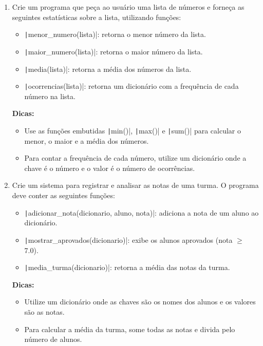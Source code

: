 \documentclass[12pt]{article}
\begin{document}
\begin{enumerate}
  \item Crie um programa que peça ao usuário uma lista de números e forneça as seguintes estatísticas sobre a lista, utilizando funções:
    \begin{itemize}
      \item \texttt|menor_numero(lista)|: retorna o menor número da lista.
      \item \texttt|maior_numero(lista)|: retorna o maior número da lista.
      \item \texttt|media(lista)|: retorna a média dos números da lista.
      \item \texttt|ocorrencias(lista)|: retorna um dicionário com a frequência de cada número na lista.
    \end{itemize}
    \textbf{Dicas:}
    \begin{itemize}
      \item Use as funções embutidas \texttt|min()|, \texttt|max()| e \texttt|sum()| para calcular o menor, o maior e a média dos números.
      \item Para contar a frequência de cada número, utilize um dicionário onde a chave é o número e o valor é o número de ocorrências.
    \end{itemize}
  \item Crie um sistema para registrar e analisar as notas de uma turma. O programa deve conter as seguintes funções:
    \begin{itemize}
      \item \texttt|adicionar_nota(dicionario, aluno, nota)|: adiciona a nota de um aluno ao dicionário.
      \item \texttt|mostrar_aprovados(dicionario)|: exibe os alunos aprovados (nota $\geq$ 7.0).
      \item \texttt|media_turma(dicionario)|: retorna a média das notas da turma.
    \end{itemize}
    \textbf{Dicas:}
    \begin{itemize}
      \item Utilize um dicionário onde as chaves são os nomes dos alunos e os valores são as notas.
      \item Para calcular a média da turma, some todas as notas e divida pelo número de alunos.
    \end{itemize}


\end{enumerate}
\end{document}
